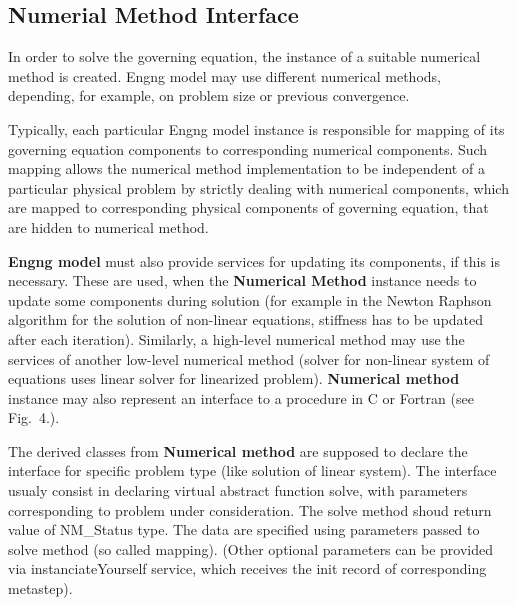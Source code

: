 \documentclass[12pt,draft]{article}
\newcommand{\class}[1]{{\bf #1}}
\begin{document}
\subsection{Numerial Method Interface}
In order
to solve the governing equation, the  instance of a suitable numerical method
is created. Engng model may use different numerical methods,
depending, for example, on problem size or previous convergence. 

Typically, each particular Engng model instance is responsible
for mapping of its governing equation components to corresponding
numerical components. Such mapping allows the numerical method implementation
to be independent of a particular physical problem by strictly dealing
with numerical components, which are mapped to corresponding physical
components of governing equation, that are  hidden to numerical method.

\class{Engng model} must also provide services for updating its
components, if this is necessary. These are used, when the \class{Numerical
Method} instance needs to update  some components during solution (for
example in the Newton Raphson algorithm for the solution of non-linear
equations, stiffness has to be updated after each
iteration). Similarly,  
a high-level numerical method may use the services of another
low-level numerical method (solver for non-linear system  of equations
uses  linear solver for linearized problem). \class{Numerical method}
instance may also represent an interface to a procedure in C or
Fortran (see Fig.~4.). 





The derived classes from \class{Numerical method} are supposed to
declare the interface for specific problem type
(like solution of linear system). The interface usualy consist in
declaring virtual abstract function solve, with parameters corresponding
to problem under consideration. The solve method shoud return
value of NM\_Status type. The data are specified using parameters passed to solve method (so called
mapping). (Other optional parameters can be provided via instanciateYourself
service, which receives the init record of corresponding metastep).
\end{document}
